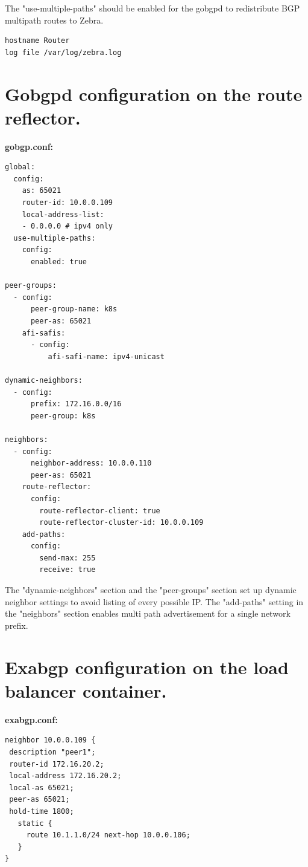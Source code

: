 The "use-multiple-paths" should be enabled for the gobgpd to redistribute BGP multipath routes to Zebra.

\par\bigskip
{}
\begin{verbatim}
hostname Router
log file /var/log/zebra.log
\end{verbatim}


\section{Gobgpd configuration on the route reflector.}
\label{appendix:route_reflector_config}

{\bf\normalsize gobgp.conf:}
\begin{verbatim}
global:
  config:
    as: 65021
    router-id: 10.0.0.109
    local-address-list:
    - 0.0.0.0 # ipv4 only
  use-multiple-paths:
    config:
      enabled: true

peer-groups:
  - config:
      peer-group-name: k8s
      peer-as: 65021
    afi-safis:
      - config:
          afi-safi-name: ipv4-unicast

dynamic-neighbors:
  - config:
      prefix: 172.16.0.0/16
      peer-group: k8s

neighbors:
  - config:
      neighbor-address: 10.0.0.110
      peer-as: 65021
    route-reflector:
      config:
        route-reflector-client: true
        route-reflector-cluster-id: 10.0.0.109
    add-paths: 
      config:
        send-max: 255
        receive: true

\end{verbatim}

The "dynamic-neighbors" section and the "peer-groups" section set up dynamic neighbor settings to avoid listing of every possible IP. 
The "add-paths" setting in the "neighbors" section enables multi path advertisement for a single network prefix.

\section{Exabgp configuration on the load balancer container.}
\label{appendix:exabgp_config}

{\bf\normalsize exabgp.conf:}
\begin{verbatim}
neighbor 10.0.0.109 {
 description "peer1";
 router-id 172.16.20.2;
 local-address 172.16.20.2;
 local-as 65021;
 peer-as 65021;
 hold-time 1800;
   static {
     route 10.1.1.0/24 next-hop 10.0.0.106;
   }
}
\end{verbatim}

